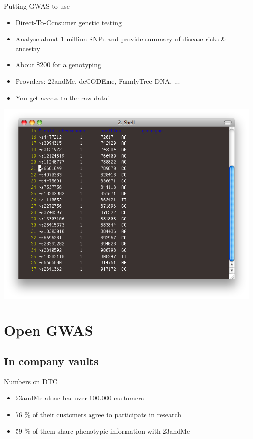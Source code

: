 \documentclass[12pt,a4paper]{beamer}
\begin{document}
\begin{frame}{Putting GWAS to use}
\begin{itemize}
\item Direct-To-Consumer genetic testing
\item Analyse about 1 million SNPs and provide summary of disease risks \& ancestry
\item About \$200 for a genotyping
\pause \item Providers: 23andMe, deCODEme, FamilyTree DNA, ...
\pause \item You get access to the raw data!
\end{itemize}
\begin{flushright}
\includegraphics[scale=0.2]{23andme.png}
\end{flushright}
\end{frame}

\section{Open GWAS}
\subsection{In company vaults}

\begin{frame}{Numbers on DTC}
\begin{itemize}
\item 23andMe alone has over 100.000 customers
\pause \item 76 \% of their customers agree to participate in research
\pause \item 59 \% of them share phenotypic information with 23andMe
\end{itemize}
\end{frame}
\end{document}
